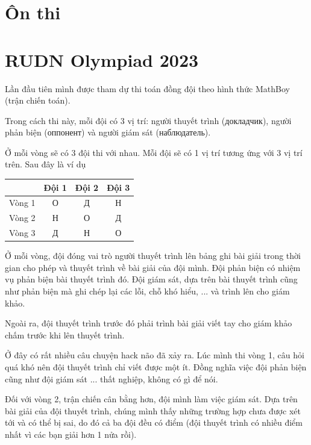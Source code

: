\documentclass{mynotes}
\begin{document}
\chapter{Ôn thi}



\chapter{RUDN Olympiad 2023}

Lần đầu tiên mình được tham dự thi toán đồng đội theo hình thức MathBoy (trận chiến toán).

Trong cách thi này, mỗi đội có 3 vị trí: người thuyết trình (докладчик), người phản biện (оппонент) và người giám sát (наблюдатель).

Ở mỗi vòng sẽ có 3 đội thi với nhau. Mỗi đội sẽ có 1 vị trí tương ứng với 3 vị trí trên. Sau đây là ví dụ

\begin{table}[ht]
    \centering
    \begin{tabular}{|c|c|c|c|}
        \hline
        & Đội 1 & Đội 2 & Đội 3 \\ \hline
        Vòng 1 & О & Д & Н \\ \hline
        Vòng 2 & Н & О & Д \\ \hline
        Vòng 3 & Д & Н & О \\ \hline
    \end{tabular}
\end{table}

Ở mỗi vòng, đội đóng vai trò người thuyết trình lên bảng ghi bài giải trong thời gian cho phép và thuyết trình về bài giải của đội mình. Đội phản biện có nhiệm vụ phản biện bài thuyết trình đó. Đội giám sát, dựa trên bài thuyết trình cũng như phản biện mà ghi chép lại các lỗi, chỗ khó hiểu, ... và trình lên cho giám khảo.

Ngoài ra, đội thuyết trình trước đó phải trình bài giải viết tay cho giám khảo chấm trước khi lên thuyết trình.

Ở đây có rất nhiều câu chuyện hack não đã xảy ra. Lúc mình thi vòng 1, câu hỏi quá khó nên đội thuyết trình chỉ viết được một ít. Đồng nghĩa việc đội phản biện cũng như đội giám sát ... thất nghiệp, không có gì để nói.

Đối với vòng 2, trận chiến cân bằng hơn, đội mình làm việc giám sát. Dựa trên bài giải của đội thuyết trình, chúng mình thấy những trường hợp chưa được xét tới và có thể bị sai, do đó cả ba đội đều có điểm (đội thuyết trình có nhiều điểm nhất vì các bạn giải hơn 1 nửa rồi).
\end{document}
